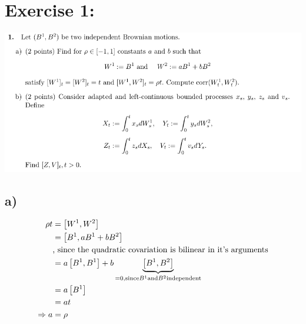\documentclass[document.tex]{subfiles}
\begin{document}
\section*{Exercise 1:}

\includegraphics[width=\textwidth]{ex1.png}

\subsection*{a)}
\begin{align*}
	\rho t &= \left[W^1 , W^2 \right] \\
	&= \left[B^1 , a B^1 + b B^2 \right] \\
	&\text{, since the quadratic covariation is bilinear in it's arguments}\\
	&= a \left[B^1 , B^1 \right] + b \underbrace{\left[B^1 , B^2 \right]}_{=0, \text{since} B^1 \text{and} B^2 \text{independent}} \\
	&= a \left[ B^1 \right] \\
	&= a t \\
\Rightarrow a &= \rho	 
\end{align*}
\end{document}
